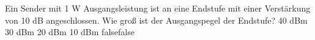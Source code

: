     {Ein Sender mit 1 W Ausgangsleistung ist an eine Endstufe mit einer Verstärkung von 10 dB angeschlossen. Wie groß ist der Ausgangspegel der Endstufe?}
    {40 dBm}
    {30 dBm}
    {20 dBm}
    {10 dBm}
    {false}{false}